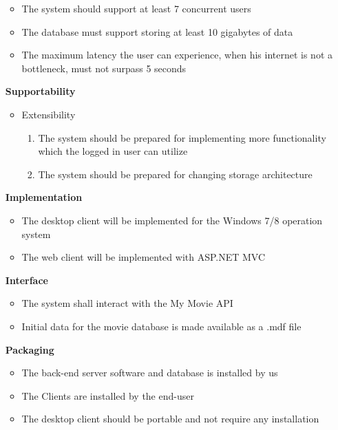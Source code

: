\begin{itemize}
\vspace{0.2cm}

\begin{itemize}
\item The system should support at least 7 concurrent users
\item The database must support storing at least 10 gigabytes of data
\item The maximum latency the user can experience, when his internet is not a bottleneck, must not surpass 5 seconds
\end{itemize}

\vspace{0.2cm}
\item[\textbf{Supportability}]
\begin{itemize}
\item Extensibility
\begin{enumerate}
\item The system should be prepared for implementing more functionality which the logged in user can utilize
\item The system should be prepared for changing storage architecture
\end{enumerate}
\end{itemize}

\vspace{0.2cm}
\item[\textbf{Implementation}]
\begin{itemize}
\item The desktop client will be implemented for the Windows 7/8 operation system
\item The web client will be implemented with ASP.NET MVC
\end{itemize}

\vspace{0.2cm}
\item[\textbf{Interface}]
\begin{itemize}
\item The system shall interact with the My Movie API
\item Initial data for the movie database is made available as a .mdf file
\end{itemize}

\vspace{0.2cm}
\item[\textbf{Packaging}]
\begin{itemize}
\item The back-end server software and database is installed by us
\item The Clients are installed by the end-user
\item The desktop client should be portable and not require any installation
\end{itemize}

\end{itemize}


